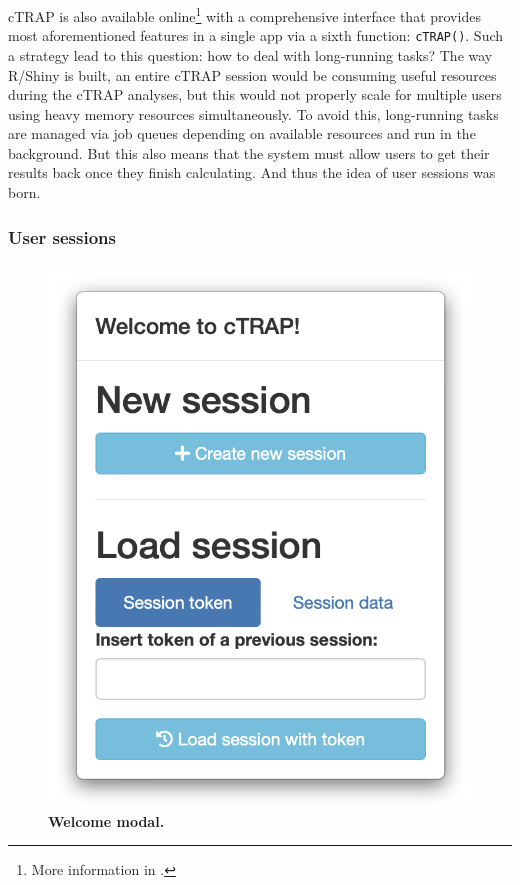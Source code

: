 cTRAP is also available online\footnote{More information in .} with a comprehensive interface that provides most aforementioned features in a single app via a sixth function: \texttt{cTRAP()}. Such a strategy lead to this question: how to deal with long-running tasks? The way R/Shiny is built, an entire cTRAP session would be consuming useful resources during the cTRAP analyses, but this would not properly scale for multiple users using heavy memory resources simultaneously. To avoid this, long-running tasks are managed via job queues depending on available resources and run in the background. But this also means that the system must allow users to get their results back once they finish calculating. And thus the idea of user sessions was born.

\subsubsection{User sessions}
\label{sec:ctrap-web}

\begin{figure}
  \vspace{-2\intextsep}
  \includegraphics[width=\linewidth]{images/ctrap/welcome}
  \caption[Welcome screen modal]{\textbf{Welcome modal.}}
  \vspace{-1\intextsep}
  \label{fig:ctrap-welcome}
\end{figure}

